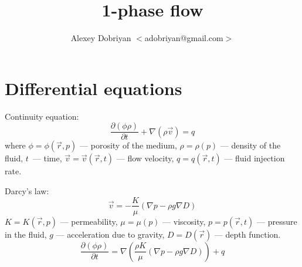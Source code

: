 \documentclass{article}
\begin{document}
\title{1-phase flow}
\author{Alexey Dobriyan $<$adobriyan@gmail.com$>$}
\maketitle

\section{Differential equations}

Continuity equation:
\begin{equation}
\frac{\partial (\phi \rho)}{\partial t} + \nabla (\rho \vec{v}) = q
\end{equation}
where $\phi = \phi(\vec{r}, p)$ --- porosity of the medium, $\rho = \rho(p)$
--- density of the fluid, $t$~--- time, $\vec{v} = \vec{v}(\vec{r}, t)$ ---
flow velocity, $q = q(\vec{r}, t)$ --- fluid injection rate.

Darcy's law:
\begin{equation}
\vec{v} = -\frac{K}{\mu} (\nabla p - \rho g \nabla D)
\end{equation}
$K = K(\vec{r}, p)$ --- permeability, $\mu = \mu(p)$ --- viscosity, $p =
p(\vec{r}, t)$ --- pressure in the fluid, $g$ --- acceleration due to gravity,
$D = D(\vec{r})$ --- depth function.
\begin{equation}
\frac{\partial (\phi \rho)}{\partial t} = \nabla \left(\frac{\rho K}{\mu}
(\nabla p - \rho g \nabla D) \right) + q
\end{equation}
\end{document}
